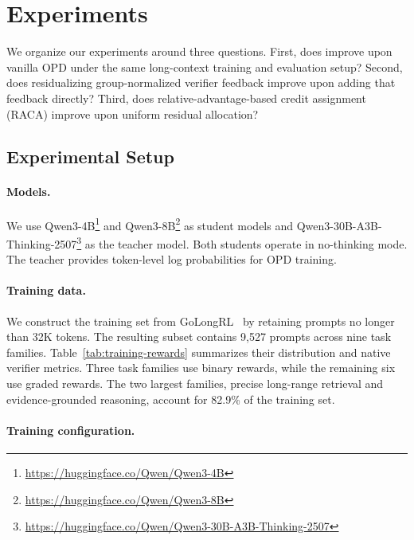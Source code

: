 \section{Experiments}

We organize our experiments around three questions. First, does \method{} improve upon vanilla OPD under the same long-context training and evaluation setup? Second, does residualizing group-normalized verifier feedback improve upon adding that feedback directly? Third, does relative-advantage-based credit assignment (RACA) improve upon uniform residual allocation?

\subsection{Experimental Setup}

\paragraph{Models.}

We use Qwen3-4B\footnote{\url{https://huggingface.co/Qwen/Qwen3-4B}} and Qwen3-8B\footnote{\url{https://huggingface.co/Qwen/Qwen3-8B}} as student models and Qwen3-30B-A3B-Thinking-2507\footnote{\url{https://huggingface.co/Qwen/Qwen3-30B-A3B-Thinking-2507}} as the teacher model. Both students operate in no-thinking mode. The teacher provides token-level log probabilities for OPD training.

\paragraph{Training data.}

We construct the training set from GoLongRL~\citep{lv2026golongrl} by retaining prompts no longer than 32K tokens. The resulting subset contains 9{,}527 prompts across nine task families. Table~\ref{tab:training-rewards} summarizes their distribution and native verifier metrics. Three task families use binary rewards, while the remaining six use graded rewards. The two largest families, precise long-range retrieval and evidence-grounded reasoning, account for 82.9\% of the training set.



\ifdefined\GCOPDSingleColumnLayout\else

\fi

\paragraph{Training configuration.}


